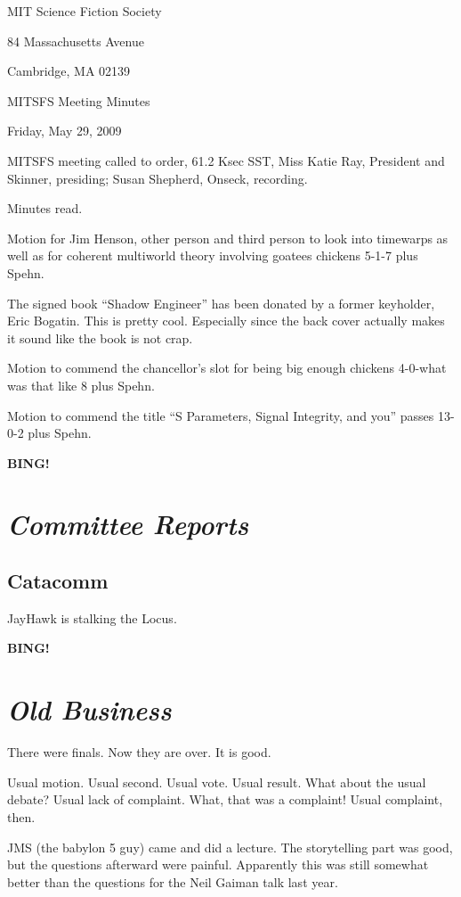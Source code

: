 \documentclass[10pt]{article}
\newcommand{\bing}{{\bf BING!} }
\newcommand{\goto}[1]{\bing \vskip 12pt \section*{{\em{#1}}}}
\newcommand{\ps}{ plus Spehn\xspace}
\begin{document}
\begin{center}

MIT Science Fiction Society

84 Massachusetts Avenue

Cambridge, MA 02139

\vspace{12pt}

MITSFS Meeting Minutes

Friday, May 29, 2009

\end{center}

\vspace{18pt}

\setlength{\parskip}{6pt}

\noindent
MITSFS meeting called to order, 61.2 Ksec SST,
Miss Katie Ray, President and Skinner, presiding; Susan Shepherd, Onseck, recording.

Minutes read.

Motion for Jim Henson, other person and third person to look into timewarps as well as for coherent multiworld theory involving goatees chickens 5-1-7 \ps.

The signed book ``Shadow Engineer'' has been donated by a former keyholder, Eric Bogatin. This is pretty cool. Especially since the back cover actually makes it sound like the book is not crap. 

Motion to commend the chancellor's slot for being big enough chickens 4-0-what was that like 8\ps.

Motion to commend the title ``S Parameters, Signal Integrity, and you'' passes 13-0-2\ps.

\goto{Committee Reports}

\subsection*{Catacomm}
JayHawk is stalking the Locus.

\goto{Old Business}

There were finals. Now they are over. It is good.

Usual motion. Usual second. Usual vote. Usual result. What about the usual debate? Usual lack of complaint. What, that was a complaint! Usual complaint, then.

JMS (the babylon 5 guy) came and did a lecture. The storytelling part was good, but the questions afterward were painful. Apparently this was still somewhat better than the questions for the Neil Gaiman talk last year.
\end{document}
